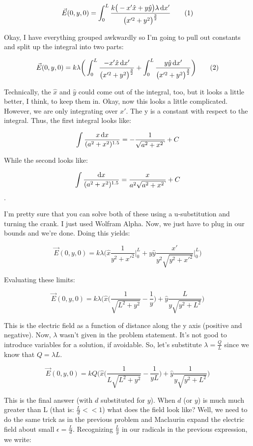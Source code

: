 \begin{homeworkProblem}[Problem 23.42]
\[ \vec{E}(0,y,0) = \int_0^L \frac{k \big(-x'\hat{x}+y\hat{y} \big) \lambda \diff x'}{\big( x'^2 + y^2\big)^\frac{3}{2}} \addtag \]

Okay, I have everything grouped awkwardly so I'm going to pull out constants and split up the integral into two parts:

\[ \vec{E}(0,y,0) = k \lambda \bigg( \int_0^L \frac{-x'\hat{x} \diff x'}{\big( x'^2 + y^2\big)^\frac{3}{2}} + \int_0^L \frac{y\hat{y} \diff x'}{\big( x'^2 + y^2\big)^\frac{3}{2}} \bigg) \addtag \]

Technically, the $\hat{x}$ and $\hat{y}$ could come out of the integral, too, but it looks a little better, I think, to keep them in. Okay, now this looks a little complicated. However, we are only integrating over $x'$. The y is a constant with respect to the integral. Thus, the first integral looks like: 

\[ \int \frac{x \diff x}{(a^2+x^2)^{1.5}} = -\frac{1}{\sqrt{a^2+x^2}} + C \]

While the second looks like:

\[ \int \frac{\diff x}{(a^2 + x^2)^{1.5}} = \frac{x}{a^2\sqrt{a^2+x^2}} + C\].

I'm pretty sure that you can solve both of these using a u-substitution and turning the crank. I just used Wolfram Alpha. Now, we just have to plug in our bounds and we're done. Doing this yields:


\[ \vec{E}(0,y,0) = k \lambda \bigg( \hat{x} \frac{1}{y^2+x'^2}\Big|_0^L + y \hat{y} \frac{x'}{y^2\sqrt{y^2+x'^2}}\Big|_0^L \bigg) \]

Evaluating these limits:

\[ \vec{E}(0,y,0) = k \lambda \bigg( \hat{x} \big( \frac{1}{\sqrt{L^2+ y^2}} - \frac{1}{y } \big) + \hat{y} \frac{L}{y\sqrt{y^2+L^2}} \bigg) \]

This is the electric field as a function of distance along the y axis (positive and negative). Now, $\lambda$ wasn't given in the problem statement. It's not good to introduce variables for a solution, if avoidable. So, let's substitute $\lambda = \frac{Q}{L}$ since we know that $Q = \lambda L$. 

\[ \vec{E}(0,y,0) = k Q \bigg( \hat{x} \big( \frac{1}{L \sqrt{L^2+ y^2}} - \frac{1}{y L} \big) + \hat{y} \frac{1}{y\sqrt{y^2+L^2}} \bigg) \]

This is the final answer (with $d$ substituted for $y$). When $d$ (or $y$) is much much greater than L (that is: $\frac{L}{d} << 1$) what does the field look like? Well, we need to do the same trick as in the previous problem and Maclaurin expand the electric field about small $\epsilon = \frac{L}{d}$. Recognizing $\frac{L}{y}$ in our radicals in the previous expression, we write:


\end{homeworkProblem}
